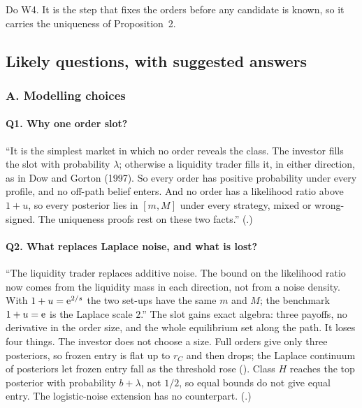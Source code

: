 \begin{panelnote}
Do W4. It is the step that fixes the orders before any candidate is known, so it carries the uniqueness of
Proposition~2.
\end{panelnote}

\subsection{Likely questions, with suggested answers}\label{sec:13_panel-questions}

\subsubsection*{A. Modelling choices}

\paragraph{Q1. Why one order slot?}
``It is the simplest market in which no order reveals the class. The investor fills the slot with probability
\(\lambda\); otherwise a liquidity trader fills it, in either direction, as in Dow and Gorton (1997). So every order
has positive probability under every profile, and no off-path belief enters. And no order has a likelihood ratio
above \(1+u\), so every posterior lies in \([m,M]\) under every strategy, mixed or wrong-signed. The uniqueness
proofs rest on these two facts.'' (.)

\paragraph{Q2. What replaces Laplace noise, and what is lost?}
``The liquidity trader replaces additive noise. The bound on the likelihood ratio now comes from the liquidity mass
in each direction, not from a noise density. With \(1+u=\mathrm{e}^{2/s}\) the two set-ups have the same \(m\) and \(M\);
the benchmark \(1+u=\mathrm{e}\) is the Laplace scale \(2\).'' The slot gains exact algebra: three payoffs, no derivative in
the order size, and the whole equilibrium set along the path. It loses four things. The investor does not choose a
size. Full orders give only three posteriors, so frozen entry is flat up to \(r_C\) and then drops; the Laplace continuum
of posteriors let frozen entry fall as the threshold rose (). Class \(H\) reaches the top posterior with
probability \(b+\lambda\), not \(1/2\), so equal bounds do not give equal entry. The logistic-noise extension has no
counterpart. (.)

